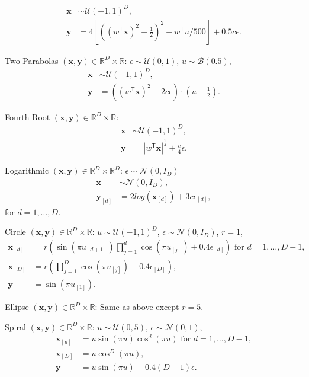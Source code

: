\documentclass[11pt]{article}
\providecommand{\mb}[1]{\boldsymbol{#1}}
\providecommand{\mc}[1]{\mathcal{#1}}
\newcommand{\Real}{\mathbb{R}}
\newcommand{\T}{^{\ensuremath{\mathsf{T}}}}           %
\newcommand{\mbx}{\ensuremath{\mb{x}}}
\newcommand{\mby}{\ensuremath{\mb{y}}}
\begin{document}
\begin{compactenum}
\begin{align*}
\mbx &\sim \mc{U}(-1,1)^{D},\\
\mby&=4\left[ \left( (w\T \mbx)^2 - \tfrac{1}{2} \right)^2 + w\T u/500 \right]+0.5c\epsilon.
\end{align*}
\item Two Parabolas $(\mbx,\mby) \in \Real^{D} \times \Real$: $\epsilon \sim \mc{U}(0,1)$, $u \sim \mc{B}(0.5)$,
\begin{align*}
\mbx &\sim \mc{U}(-1,1)^{D},\\
\mby&=\left( (w\T \mbx)^2  + 2c\epsilon\right) \cdot (u-\tfrac{1}{2}).
\end{align*}
\item Fourth Root $(\mbx,\mby) \in \Real^{D} \times \Real$:
\begin{align*}
\mbx &\sim \mc{U}(-1,1)^{D},\\
\mby&=|w\T \mbx|^\frac{1}{4}+\frac{c}{4}\epsilon.
\end{align*}
\item Logarithmic $(\mbx,\mby) \in \Real^{D} \times \Real^{D}$: $\epsilon \sim \mc{N}(0, I_{D})$
\begin{align*}
\mbx &\sim \mc{N}(0, I_{D}),\\
\mby_{[d]}&=2log(\mbx_{[d]})+3c\epsilon_{[d]},
\end{align*}
for $d=1,\ldots,D$.
\item Circle $(\mbx,\mby) \in \Real^{D} \times \Real$: $u \sim \mc{U}(-1,1)^{D}$, $\epsilon \sim \mc{N}(0, I_{D})$, $r=1$,
\begin{align*}
\mbx_{[d]}&=r \left(\sin(\pi u_{[d+1]})  \prod_{j=1}^{d} \cos(\pi u_{[j]})+0.4 \epsilon_{[d]}\right) \mbox{ for $d=1,\ldots,D-1$},\\
\mbx_{[D]}&=r \left(\prod_{j=1}^{D} \cos(\pi u_{[j]})+0.4 \epsilon_{[D]}\right),\\
\mby&= \sin(\pi u_{[1]}).
\end{align*}
\item Ellipse $(\mbx,\mby) \in \Real^{D} \times \Real$: Same as above except $r=5$.

\item Spiral $(\mbx,\mby) \in \Real^{D} \times \Real$: $u \sim \mc{U}(0,5)$, $\epsilon \sim \mc{N}(0, 1)$,
\begin{align*}
\mbx_{[d]}&=u \sin(\pi u)  \cos^{d}(\pi u) \mbox{ for $d=1,\ldots,D-1$},\\
\mbx_{[D]}&=u \cos^{D}(\pi u),\\
\mby&= u \sin(\pi u) +0.4 (D-1)\epsilon.
\end{align*}


\end{compactenum}
\end{document}
